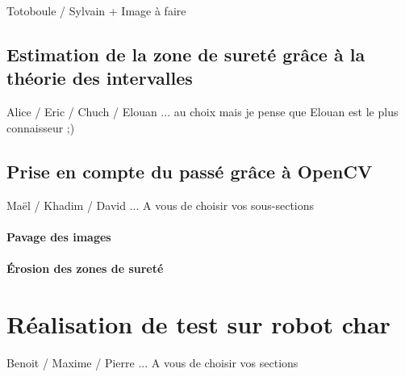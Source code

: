 \documentclass[10pt,a4paper]{report}
\begin{document}
Totoboule / Sylvain + Image à faire

\section{Estimation de la zone de sureté grâce à la théorie des intervalles}

Alice / Eric / Chuch / Elouan ... au choix mais je pense que Elouan est le plus connaisseur ;)


\section{Prise en compte du passé grâce à OpenCV}

Maël / Khadim / David  ... A vous de choisir vos sous-sections

\subsubsection{Pavage des images}

\subsubsection{Érosion des zones de sureté}


\chapter{Réalisation de test sur robot char}

Benoit / Maxime / Pierre ... A vous de choisir vos sections
\end{document}

